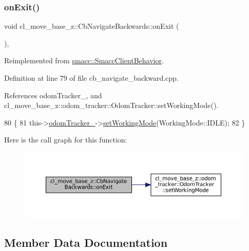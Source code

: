 \subsubsection{\texorpdfstring{on\+Exit()}{onExit()}}
{\footnotesize\ttfamily void cl\+\_\+move\+\_\+base\+\_\+z\+::\+Cb\+Navigate\+Backwards\+::on\+Exit (\begin{DoxyParamCaption}{ }\end{DoxyParamCaption})\hspace{0.3cm}{\ttfamily [override]}, {\ttfamily [virtual]}}



Reimplemented from \hyperlink{classsmacc_1_1SmaccClientBehavior_ac0cd72d42bd00425362a97c9803ecce5}{smacc\+::\+Smacc\+Client\+Behavior}.



Definition at line 79 of file cb\+\_\+navigate\+\_\+backward.\+cpp.



References odom\+Tracker\+\_\+, and cl\+\_\+move\+\_\+base\+\_\+z\+::odom\+\_\+tracker\+::\+Odom\+Tracker\+::set\+Working\+Mode().


\begin{DoxyCode}
80 \{
81     this->\hyperlink{classcl__move__base__z_1_1CbNavigateBackwards_a75a8ae7aef6c72e96f4037c4941b0341}{odomTracker\_}->\hyperlink{classcl__move__base__z_1_1odom__tracker_1_1OdomTracker_aeed01bdefd9a1cc709b0b3e4eed285ed}{setWorkingMode}(WorkingMode::IDLE);
82 \}
\end{DoxyCode}
Here is the call graph for this function\+:
\nopagebreak
\begin{figure}[H]
\begin{center}
\leavevmode
\includegraphics[width=350pt]{classcl__move__base__z_1_1CbNavigateBackwards_a92858e20e6401051203f5dfa4aef60dc_cgraph}
\end{center}
\end{figure}


\subsection{Member Data Documentation}
\mbox{\label{classcl__move__base__z_1_1CbNavigateBackwards_abb7099e4e18602f6cf06c4f5534a2a15}} 
